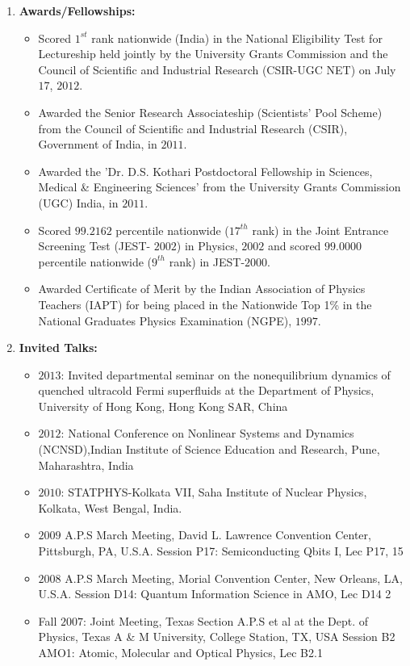 \documentclass[a4paper,11pt,color]{article}
\begin{document}
\begin{enumerate}
\item
\textbf{Awards/Fellowships:}
\begin{itemize}
 \item 
 Scored $1^{st}$ rank nationwide (India) in the National Eligibility Test for Lectureship held jointly
by the University Grants Commission and the Council of Scientific and Industrial Research
(CSIR-UGC NET) on July $17$, $2012$.
\item
Awarded the Senior Research Associateship (Scientists' Pool Scheme) from the Council of
Scientific and Industrial Research (CSIR), Government of India, in $2011$.
\item
Awarded the 'Dr. D.S. Kothari Postdoctoral Fellowship in Sciences, Medical \& Engineering
Sciences' from the University Grants Commission (UGC) India, in $2011$.
\item
Scored $99.2162$ percentile nationwide ($17^{th}$ rank) in the Joint Entrance Screening Test (JEST-
$2002$) in Physics, $2002$ and scored $99.0000$ percentile nationwide ($9^{th}$ rank) in JEST-$2000$.
\item
Awarded Certificate of Merit by the Indian Association of Physics Teachers (IAPT) for being
placed in the Nationwide Top 1\% in the National Graduates Physics Examination (NGPE),
$1997$.
\end{itemize}
\newpage
\item
\textbf{Invited Talks:}
\begin{itemize}
 \item 
$2013$: Invited departmental seminar on the nonequilibrium dynamics of quenched ultracold Fermi superfluids at the Department of Physics, University of Hong Kong, Hong Kong SAR, China 
\item
$2012$: National Conference on Nonlinear Systems and Dynamics (NCNSD),Indian Institute of Science Education and Research, Pune, Maharashtra, India
\item
$2010$: STATPHYS-Kolkata VII, Saha Institute of Nuclear Physics, Kolkata, West Bengal, India.
\item
$2009$ A.P.S March Meeting, David L. Lawrence Convention Center, Pittsburgh, PA, U.S.A.
Session P17: Semiconducting Qbits I, Lec P17, 15
\item
$2008$ A.P.S March Meeting, Morial Convention Center, New Orleans, LA, U.S.A.
Session D14: Quantum Information Science in AMO, Lec D14 2
\item
Fall $2007$: Joint Meeting, Texas Section A.P.S et al at the Dept. of Physics, Texas A \& M University, College Station, TX, USA
Session B2 AMO1: Atomic, Molecular and Optical Physics, Lec B2.1 
\end{itemize}


\end{enumerate}
\end{document}
